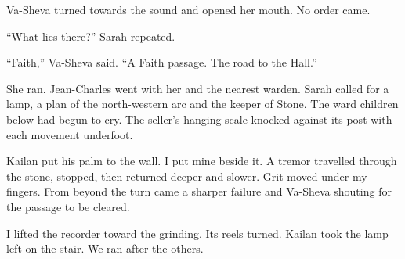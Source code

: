 Va-Sheva turned towards the sound and opened her mouth. No order came.\par

``What lies there?'' Sarah repeated.\par

``Faith,'' Va-Sheva said. ``A Faith passage. The road to the Hall.''\par

She ran. Jean-Charles went with her and the nearest warden. Sarah called for a lamp, a plan of the north-western arc and the keeper of Stone. The ward children below had begun to cry. The seller's hanging scale knocked against its post with each movement underfoot.\par

Kailan put his palm to the wall. I put mine beside it. A tremor travelled through the stone, stopped, then returned deeper and slower. Grit moved under my fingers. From beyond the turn came a sharper failure and Va-Sheva shouting for the passage to be cleared.\par

I lifted the recorder toward the grinding. Its reels turned. Kailan took the lamp left on the stair. We ran after the others.\par
